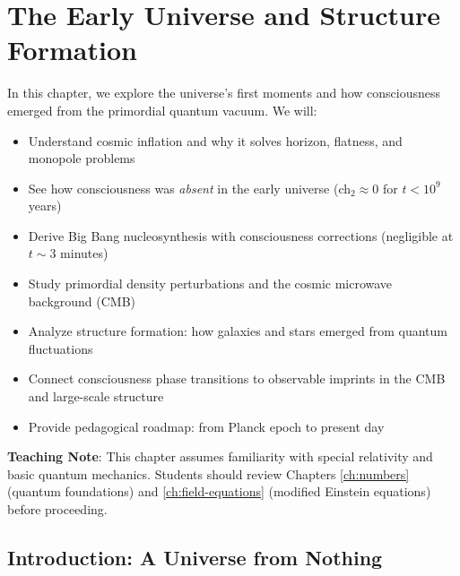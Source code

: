 \chapter{The Early Universe and Structure Formation}
\label{ch:early-universe}

\begin{chapterobjectives}
In this chapter, we explore the universe's first moments and how consciousness emerged from the primordial quantum vacuum. We will:
\begin{itemize}
\item Understand cosmic inflation and why it solves horizon, flatness, and monopole problems
\item See how consciousness was \textit{absent} in the early universe (ch$_2 \approx 0$ for $t < 10^9$ years)
\item Derive Big Bang nucleosynthesis with consciousness corrections (negligible at $t \sim 3$ minutes)
\item Study primordial density perturbations and the cosmic microwave background (CMB)
\item Analyze structure formation: how galaxies and stars emerged from quantum fluctuations
\item Connect consciousness phase transitions to observable imprints in the CMB and large-scale structure
\item Provide pedagogical roadmap: from Planck epoch to present day
\end{itemize}

\textbf{Teaching Note}: This chapter assumes familiarity with special relativity and basic quantum mechanics. Students should review Chapters \ref{ch:numbers} (quantum foundations) and \ref{ch:field-equations} (modified Einstein equations) before proceeding.
\end{chapterobjectives}

\section{Introduction: A Universe from Nothing}

